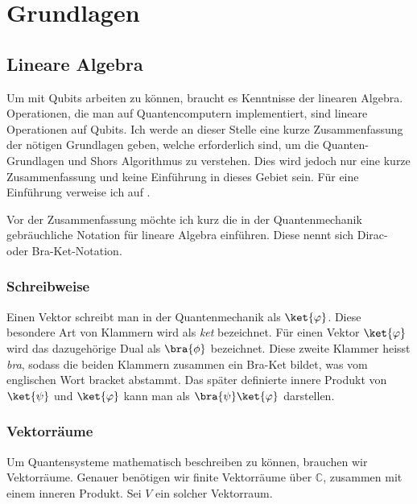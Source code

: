 \chapter{Grundlagen}
\section{Lineare Algebra}
Um mit Qubits arbeiten zu können, braucht es Kenntnisse der linearen Algebra. Operationen, die man auf Quantencomputern implementiert, sind lineare Operationen auf Qubits. Ich werde an dieser Stelle eine kurze Zusammenfassung der nötigen Grundlagen geben, welche erforderlich sind, um die Quanten-Grundlagen und Shors Algorithmus zu verstehen. Dies wird jedoch nur eine kurze Zusammenfassung und keine Einführung in dieses Gebiet sein. Für eine Einführung verweise ich auf \cite{LA}.

Vor der Zusammenfassung möchte ich kurz die in der Quantenmechanik gebräuchliche Notation für lineare Algebra einführen. Diese nennt sich Dirac- oder Bra-Ket-Notation. 

\subsection{Schreibweise}
Einen Vektor schreibt man in der Quantenmechanik als $\ket{\varphi}$. Diese besondere Art von Klammern wird als \textit{ket} bezeichnet. Für einen Vektor $\ket{\varphi}$ wird das dazugehörige Dual als $\bra{\phi}$ bezeichnet. Diese zweite Klammer heisst \textit{bra}, sodass die beiden Klammern zusammen ein Bra-Ket bildet, was vom englischen Wort bracket abstammt. Das später definierte innere Produkt von $\ket{\psi}$ und $\ket{\varphi}$ kann man als $\bra{\psi}\ket{\varphi}$ darstellen.

\subsection{Vektorräume}
Um Quantensysteme mathematisch beschreiben zu können, brauchen wir Vektorräume. Genauer benötigen wir finite Vektorräume über $\mathbb{C}$, zusammen mit einem inneren Produkt. Sei $V$ ein solcher Vektorraum. 

